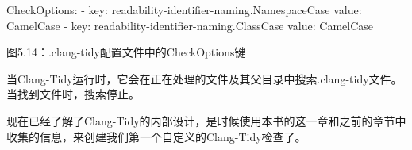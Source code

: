 \begin{shell}
CheckOptions:
- key: readability-identifier-naming.NamespaceCase
  value: CamelCase
- key: readability-identifier-naming.ClassCase
  value: CamelCase
\end{shell}

\begin{center}
图5.14：.clang-tidy配置文件中的CheckOptions键
\end{center}

当Clang-Tidy运行时，它会在正在处理的文件及其父目录中搜索.clang-tidy文件。当找到文件时，搜索停止。

现在已经了解了Clang-Tidy的内部设计，是时候使用本书的这一章和之前的章节中收集的信息，来创建我们第一个自定义的Clang-Tidy检查了。




























